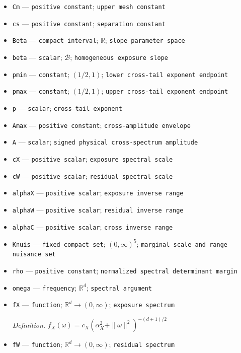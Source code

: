 \documentclass{article}
\begin{document}
\begin{itemize}
  \item \texttt{Cm} --- \texttt{positive constant}; \texttt{upper mesh constant}
  \item \texttt{cs} --- \texttt{positive constant}; \texttt{separation constant}
  \item \texttt{Beta} --- \texttt{compact interval}; \(\mathbb R\); \texttt{slope parameter space}
  \item \texttt{beta} --- \texttt{scalar}; \(\mathcal B\); \texttt{homogeneous exposure slope}
  \item \texttt{pmin} --- \texttt{constant}; \((1/2,1)\); \texttt{lower cross-\allowbreak{}tail exponent endpoint}
  \item \texttt{pmax} --- \texttt{constant}; \((1/2,1)\); \texttt{upper cross-\allowbreak{}tail exponent endpoint}
  \item \texttt{p} --- \texttt{scalar}; \texttt{cross-\allowbreak{}tail exponent}
  \item \texttt{Amax} --- \texttt{positive constant}; \texttt{cross-\allowbreak{}amplitude envelope}
  \item \texttt{A} --- \texttt{scalar}; \texttt{signed physical cross-\allowbreak{}spectrum amplitude}
  \item \texttt{cX} --- \texttt{positive scalar}; \texttt{exposure spectral scale}
  \item \texttt{cW} --- \texttt{positive scalar}; \texttt{residual spectral scale}
  \item \texttt{alphaX} --- \texttt{positive scalar}; \texttt{exposure inverse range}
  \item \texttt{alphaW} --- \texttt{positive scalar}; \texttt{residual inverse range}
  \item \texttt{alphaC} --- \texttt{positive scalar}; \texttt{cross inverse range}
  \item \texttt{Knuis} --- \texttt{fixed compact set}; \((0,\infty)^5\); \texttt{marginal scale and range nuisance set}
  \item \texttt{rho} --- \texttt{positive constant}; \texttt{normalized spectral determinant margin}
  \item \texttt{omega} --- \texttt{frequency}; \(\mathbb R^d\); \texttt{spectral argument}
  \item \texttt{fX} --- \texttt{function}; \(\mathbb R^d\to(0,\infty)\); \texttt{exposure spectrum}
  \par\smallskip\noindent\emph{Definition.} \(f_X(\omega)=c_X(\alpha_X^2+\|\omega\|^2)^{-(d+1)/2}\)
  \item \texttt{fW} --- \texttt{function}; \(\mathbb R^d\to(0,\infty)\); \texttt{residual spectrum}

\end{itemize}
\end{document}
